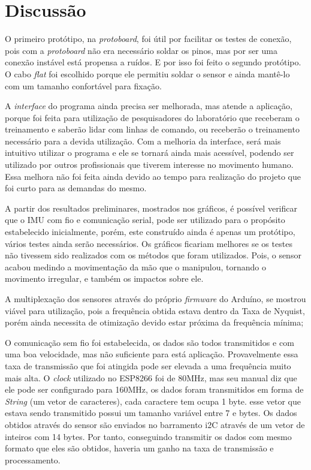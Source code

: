 	\section{Discussão}		

	O primeiro protótipo, na \textit{protoboard}, foi útil por facilitar os testes de conexão, pois com a \textit{protoboard} não era necessário soldar os pinos, mas por ser uma conexão instável está propensa a ruídos. E por isso foi feito o segundo protótipo. O cabo \textit{flat} foi escolhido porque ele permitiu soldar o sensor e ainda mantê-lo com um tamanho confortável para fixação.
	
	A \textit{interface} do programa ainda precisa ser melhorada, mas atende a aplicação, porque foi feita para utilização de pesquisadores do laboratório que receberam o treinamento e saberão lidar com linhas de comando, ou receberão o treinamento necessário para a devida utilização. Com a melhoria da interface, será mais intuitivo utilizar o programa e ele se tornará ainda mais acessível, podendo ser utilizado por outros profissionais que tiverem interesse no movimento humano. Essa melhora não foi feita ainda devido ao tempo para realização do projeto que foi curto para as demandas do mesmo.
	
	 A partir dos resultados preliminares, mostrados nos gráficos, é possível verificar que o IMU com fio e comunicação serial, pode ser utilizado  para o propósito estabelecido inicialmente, porém, este construído ainda é apenas um protótipo, vários testes ainda serão necessários. Os gráficos ficariam melhores se os testes não tivessem sido realizados com os métodos que foram utilizados. Pois, o sensor acabou medindo a movimentação da mão que o manipulou, tornando o movimento irregular, e também os impactos sobre ele.
	
	A multiplexação dos sensores através do próprio \textit{firmware} do Arduíno, se mostrou viável para utilização, pois a frequência obtida estava dentro da Taxa de Nyquist, porém ainda necessita de otimização devido estar próxima da frequência mínima;
	
	O comunicação sem fio foi estabelecida, os dados são todos transmitidos e com uma boa velocidade, mas não suficiente para está aplicação.  Provavelmente essa taxa de transmissão que foi atingida pode ser elevada a uma frequência muito mais alta. O \textit{clock} utilizado no ESP8266 foi de 80MHz, mas seu manual diz que ele pode ser configurado para 160MHz, os dados foram transmitidos em forma de \textit{String} (um vetor de caracteres), cada caractere tem ocupa 1 byte. esse vetor que estava sendo transmitido possui um tamanho variável entre 7 e  bytes. Os dados obtidos através do sensor são enviados no barramento i2C através de um vetor de inteiros com 14 bytes. Por tanto, conseguindo transmitir os dados com mesmo formato que eles são obtidos, haveria um ganho na taxa de transmissão e processamento.
	
